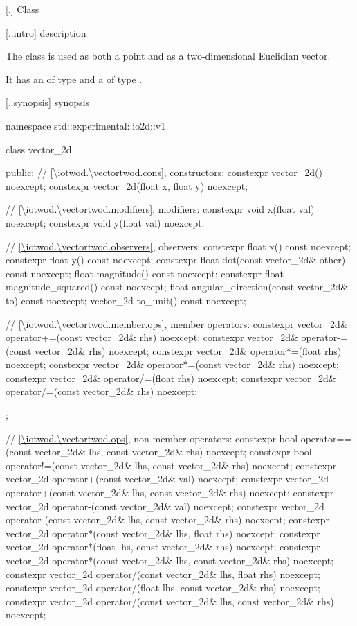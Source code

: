  [\iotwod.\vectortwod] {Class }

 [\iotwod.\vectortwod.intro] { description}

%
\pnum
The class  is used as both a point and as a two-dimensional Euclidian vector.

\pnum
It has an  of type  and a  of type .

 [\iotwod.\vectortwod.synopsis] { synopsis}

\begin{codeblock}
namespace std::experimental::io2d::v1 {
  class vector_2d {
  public:
    // \ref{\iotwod.\vectortwod.cons}, constructors:
    constexpr vector_2d() noexcept;
    constexpr vector_2d(float x, float y) noexcept;

    // \ref{\iotwod.\vectortwod.modifiers}, modifiers:
    constexpr void x(float val) noexcept;
    constexpr void y(float val) noexcept;
    
    // \ref{\iotwod.\vectortwod.observers}, observers:
    constexpr float x() const noexcept;
    constexpr float y() const noexcept;
    constexpr float dot(const vector_2d& other) const noexcept;
    float magnitude() const noexcept;
    constexpr float magnitude_squared() const noexcept;
    float angular_direction(const vector_2d& to) const noexcept;
    vector_2d to_unit() const noexcept;
    
    // \ref{\iotwod.\vectortwod.member.ops}, member operators:
    constexpr vector_2d& operator+=(const vector_2d& rhs) noexcept;
    constexpr vector_2d& operator-=(const vector_2d& rhs) noexcept;
    constexpr vector_2d& operator*=(float rhs) noexcept;
    constexpr vector_2d& operator*=(const vector_2d& rhs) noexcept;
    constexpr vector_2d& operator/=(float rhs) noexcept;
    constexpr vector_2d& operator/=(const vector_2d& rhs) noexcept;
  };
  
  // \ref{\iotwod.\vectortwod.ops}, non-member operators:
  constexpr bool operator==(const vector_2d& lhs, const vector_2d& rhs)
    noexcept;
  constexpr bool operator!=(const vector_2d& lhs, const vector_2d& rhs)
    noexcept;
  constexpr vector_2d operator+(const vector_2d& val) noexcept;
  constexpr vector_2d operator+(const vector_2d& lhs, const vector_2d& rhs)
    noexcept;
  constexpr vector_2d operator-(const vector_2d& val) noexcept;
  constexpr vector_2d operator-(const vector_2d& lhs, const vector_2d& rhs)
    noexcept;
  constexpr vector_2d operator*(const vector_2d& lhs, float rhs) noexcept;
  constexpr vector_2d operator*(float lhs, const vector_2d& rhs) noexcept;
  constexpr vector_2d operator*(const vector_2d& lhs, const vector_2d& rhs)
    noexcept;
  constexpr vector_2d operator/(const vector_2d& lhs, float rhs) noexcept;
  constexpr vector_2d operator/(float lhs, const vector_2d& rhs) noexcept;
  constexpr vector_2d operator/(const vector_2d& lhs, const vector_2d& rhs)
    noexcept;
}
\end{codeblock}

